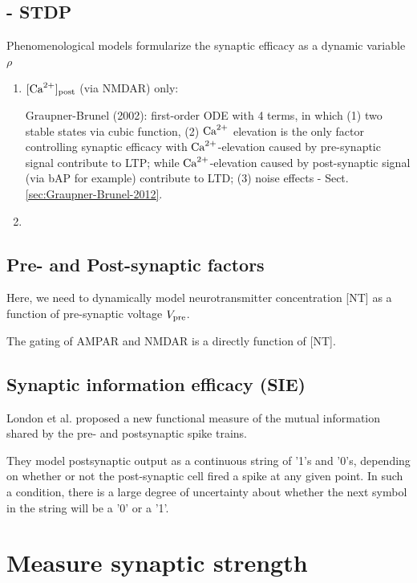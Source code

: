 \subsection{- STDP}

Phenomenological models formularize the synaptic efficacy as a dynamic variable
$\rho$
\begin{enumerate}
  
  \item  $[{\text{Ca}^{2+}}]_{\text{post}}$ (via NMDAR) only:
  
  Graupner-Brunel (2002): first-order ODE with 4 terms, in which (1) two
  stable states via cubic function, (2) ${\text{Ca}^{2+}}$ elevation is the only factor
  controlling synaptic efficacy with ${\text{Ca}^{2+}}$-elevation caused by pre-synaptic
  signal contribute to LTP; while ${\text{Ca}^{2+}}$-elevation caused by post-synaptic signal
  (via bAP for example) contribute to LTD; (3) noise effects -
  Sect.\ref{sec:Graupner-Brunel-2012}.
  
  \item
\end{enumerate}

\subsection{Pre- and Post-synaptic factors}

Here, we need to dynamically model neurotransmitter concentration [NT]
as a function of pre-synaptic voltage $V_{\text{pre}}$.

The gating of AMPAR and NMDAR is a directly function of [NT].

\subsection{Synaptic information
efficacy (SIE)}

London et al. proposed a new functional measure of the mutual information shared
by the pre- and postsynaptic spike trains.

They  model postsynaptic output as a continuous string of '1's and '0's,
depending on whether or not the post-synaptic cell fired a spike at any given
point. In such a condition, there is a large degree of  uncertainty about
whether the next symbol in the string will be a '0' or a '1'.


\section{Measure synaptic strength}

